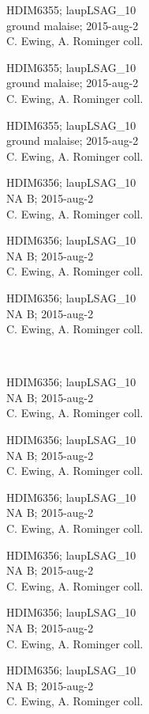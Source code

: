 \documentclass[2pt]{extarticle}
\begin{document}
\noindent
\parbox{0.16\textwidth}{\tiny \raggedright \rule[-0.3\baselineskip]{0pt}{10pt}HDIM6355; laupLSAG\_10\\ ground malaise; 2015-aug-2\\ C. Ewing, A. Rominger coll.}
\parbox{0.16\textwidth}{\tiny \raggedright \rule[-0.3\baselineskip]{0pt}{10pt}HDIM6355; laupLSAG\_10\\ ground malaise; 2015-aug-2\\ C. Ewing, A. Rominger coll.}
\parbox{0.16\textwidth}{\tiny \raggedright \rule[-0.3\baselineskip]{0pt}{10pt}HDIM6355; laupLSAG\_10\\ ground malaise; 2015-aug-2\\ C. Ewing, A. Rominger coll.}
\parbox{0.16\textwidth}{\tiny \raggedright \rule[-0.3\baselineskip]{0pt}{10pt}HDIM6356; laupLSAG\_10\\ NA B; 2015-aug-2\\ C. Ewing, A. Rominger coll.}
\parbox{0.16\textwidth}{\tiny \raggedright \rule[-0.3\baselineskip]{0pt}{10pt}HDIM6356; laupLSAG\_10\\ NA B; 2015-aug-2\\ C. Ewing, A. Rominger coll.}
\parbox{0.16\textwidth}{\tiny \raggedright \rule[-0.3\baselineskip]{0pt}{10pt}HDIM6356; laupLSAG\_10\\ NA B; 2015-aug-2\\ C. Ewing, A. Rominger coll.} \\ 
\vspace{0.001in} 

\noindent
\parbox{0.16\textwidth}{\tiny \raggedright \rule[-0.3\baselineskip]{0pt}{10pt}HDIM6356; laupLSAG\_10\\ NA B; 2015-aug-2\\ C. Ewing, A. Rominger coll.}
\parbox{0.16\textwidth}{\tiny \raggedright \rule[-0.3\baselineskip]{0pt}{10pt}HDIM6356; laupLSAG\_10\\ NA B; 2015-aug-2\\ C. Ewing, A. Rominger coll.}
\parbox{0.16\textwidth}{\tiny \raggedright \rule[-0.3\baselineskip]{0pt}{10pt}HDIM6356; laupLSAG\_10\\ NA B; 2015-aug-2\\ C. Ewing, A. Rominger coll.}
\parbox{0.16\textwidth}{\tiny \raggedright \rule[-0.3\baselineskip]{0pt}{10pt}HDIM6356; laupLSAG\_10\\ NA B; 2015-aug-2\\ C. Ewing, A. Rominger coll.}
\parbox{0.16\textwidth}{\tiny \raggedright \rule[-0.3\baselineskip]{0pt}{10pt}HDIM6356; laupLSAG\_10\\ NA B; 2015-aug-2\\ C. Ewing, A. Rominger coll.}
\parbox{0.16\textwidth}{\tiny \raggedright \rule[-0.3\baselineskip]{0pt}{10pt}HDIM6356; laupLSAG\_10\\ NA B; 2015-aug-2\\ C. Ewing, A. Rominger coll.} \\ 
\vspace{0.001in} 
\end{document}

